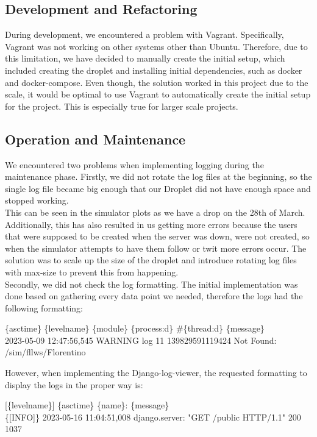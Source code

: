 \subsection*{Development and Refactoring}

During development, we encountered a problem with Vagrant. Specifically, Vagrant was not working on other systems other than Ubuntu. Therefore, due to this limitation, we have decided to manually create the initial setup, which included creating the droplet and installing initial dependencies, such as docker and docker-compose. Even though, the solution worked in this project due to the scale, it would be optimal to use Vagrant to automatically create the initial setup for the project. This is especially true for larger scale projects.

\subsection*{Operation and Maintenance}

We encountered two problems when implementing logging during the maintenance phase.
Firstly, we did not rotate the log files at the beginning, so the single log file became big enough that our Droplet did not have enough space and stopped working.\\
This can be seen in the simulator plots as we have a drop on the 28th of March. Additionally, this has also resulted in us getting more errors because the users that were supposed to be created when the server was down, were not created, so when the simulator attempts to have them follow or twit more errors occur. The solution was to scale up the size of the droplet and introduce rotating log files with max-size to prevent this from happening.\\
Secondly, we did not check the log formatting. The initial implementation was done based on gathering every data point we needed, therefore the logs had the following formatting:
\begin{center}
    \{asctime\} \{levelname\} \{module\} \{process:d\} \#\{thread:d\} \{message\}\\
    2023-05-09 12:47:56,545 WARNING log 11 139829591119424 Not Found: /sim/fllws/Florentino
\end{center}
However, when implementing the Django-log-viewer, the requested formatting to display the logs in the proper way is:

\begin{center}
    [\{levelname\}] \{asctime\} \{name\}: \{message\}\\
    \{[INFO]\} 2023-05-16 11:04:51,008 django.server: "GET /public HTTP/1.1" 200 1037
\end{center}

